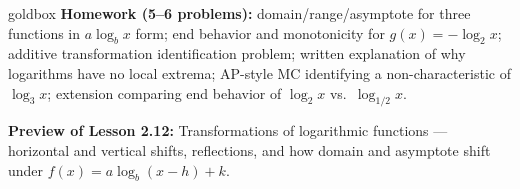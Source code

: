 \documentclass[10pt]{article}
\begin{document}
\begin{skillbox}{goldbox}
\textbf{Homework (5--6 problems):} domain/range/asymptote for three functions in $a\log_b x$
form; end behavior and monotonicity for $g(x) = -\log_2 x$; additive transformation
identification problem; written explanation of why logarithms have no local extrema;
AP-style MC identifying a non-characteristic of $\log_3 x$; extension comparing end behavior
of $\log_2 x$ vs.\ $\log_{1/2} x$.

\textbf{Preview of Lesson 2.12:} Transformations of logarithmic functions --- horizontal and
vertical shifts, reflections, and how domain and asymptote shift under $f(x) = a\log_b(x-h)+k$.
\end{skillbox}
\end{document}
